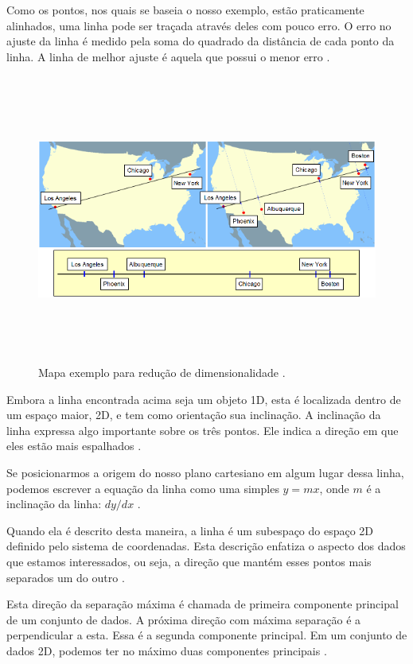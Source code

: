 Como os pontos, nos quais se baseia o nosso exemplo, estão praticamente alinhados, uma linha pode ser traçada através deles com pouco erro. O erro no ajuste da linha é medido pela soma do quadrado da distância de cada ponto da linha. A linha de melhor ajuste é aquela que possui o menor erro \cite{hewitt}.

	\begin{figure}[hbt]
		\begin{center}
			\includegraphics[height=9.5cm,width=12.5cm]{figuras/2.FundamentacaoTeorica/PCAexemploMapa.png}
		\end{center}
		\caption{Mapa exemplo para redução de dimensionalidade \cite{hewitt}.}
		\label{exemploPCA}
	\end{figure}

Embora a linha encontrada acima seja um objeto 1D, esta é localizada dentro de um espaço maior, 2D, e tem como orientação sua inclinação. A inclinação da linha expressa algo importante sobre os três pontos. Ele indica a direção em que eles estão mais espalhados \cite{hewitt}.

Se posicionarmos a origem do nosso plano cartesiano em algum lugar dessa linha, podemos escrever a equação da linha como uma simples $y = mx$, onde $\displaystyle m$ é a inclinação da linha: $dy / dx$ \cite{hewitt}.

Quando ela é descrito desta maneira, a linha é um subespaço do espaço 2D definido pelo sistema de coordenadas. Esta descrição enfatiza o aspecto dos dados que estamos interessados, ou seja, a direção que mantém esses pontos mais separados um do outro \cite{hewitt}.

Esta direção da separação máxima é chamada de primeira componente principal de um conjunto de dados. A próxima direção com máxima separação é a perpendicular a esta. Essa é a segunda componente principal. Em um conjunto de dados 2D, podemos ter no máximo duas componentes principais \cite{hewitt}.

